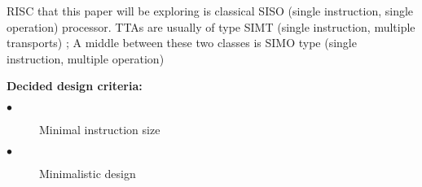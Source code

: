 \iffalse
This chapter presents the background physical or electrical theory
and on any analytical methods you will use to accomplish your goals.
If you have a research question, what is it?
Have you made any deductions from it that you are now testing?
What mathematical bases must be understood in order to interpret your results in Chapter 5?
Give the reader a solid understanding of the foundations here.
\fi

RISC that this paper will be exploring is classical SISO (single instruction, single operation) processor. TTAs are usually of type SIMT (single instruction, multiple transports) \autocite{289981}; A middle between these two classes is SIMO type (single instruction, multiple operation)

\textbf{Decided design criteria:}
\begin{description}
	\item[$\bullet$] Minimal instruction size
	\item[$\bullet$] Minimalistic design
\end{description}


